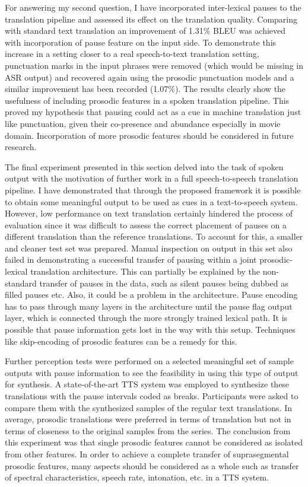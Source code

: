 For answering my second question, I have incorporated inter-lexical pauses to the translation pipeline and assessed its effect on the translation quality. Comparing with standard text translation an improvement of 1.31\% BLEU was achieved with incorporation of pause feature on the input side. To demonstrate this increase in a setting closer to a real speech-to-text translation setting, punctuation marks in the input phrases were removed (which would be missing in ASR output) and recovered again using the prosodic punctuation models and a similar improvement has been recorded (1.07\%). The results clearly show the usefulness of including prosodic features in a spoken translation pipeline. This proved my hypothesis that pausing could act as a cue in machine translation just like punctuation, given their co-presence and abundance especially in movie domain. Incorporation of more prosodic features should be considered in future research. 

The final experiment presented in this section delved into the task of spoken output with the motivation of further work in a full speech-to-speech translation pipeline. I have demonstrated that through the proposed framework it is possible to obtain some meaningful output to be used as cues in a text-to-speech system. However, low performance on text translation certainly hindered the process of evaluation since it was difficult to assess the correct placement of pauses on a different translation than the reference translations. To account for this, a smaller and cleaner test set was prepared. Manual inspection on output in this set also failed in demonstrating a successful transfer of pausing within a joint prosodic-lexical translation architecture. This can partially be explained by the non-standard transfer of pauses in the data, such as silent pauses being dubbed as filled pauses etc. Also, it could be a problem in the architecture. Pause encoding has to pass through many layers in the architecture until the pause flag output layer, which is connected through the more strongly trained lexical path. It is possible that pause information gets lost in the way with this setup. Techniques like skip-encoding \citep{Quoc2017} of prosodic features can be a remedy for this. 

Further perception tests were performed on a selected meaningful set of sample outputs with pause information to see the feasibility in using this type of output for synthesis. A state-of-the-art TTS system was employed to synthesize these translations with the pause intervals coded as breaks. Participants were asked to compare them with the synthesized samples of the regular text translations. In average, prosodic translations were preferred in terms of translation but not in terms of closeness to the original samples from the series. The conclusion from this experiment was that single prosodic features cannot be considered as isolated from other features. In order to achieve a complete transfer of suprasegmental prosodic features, many aspects should be considered as a whole such as transfer of spectral characteristics, speech rate, intonation, etc. in a TTS system. 

